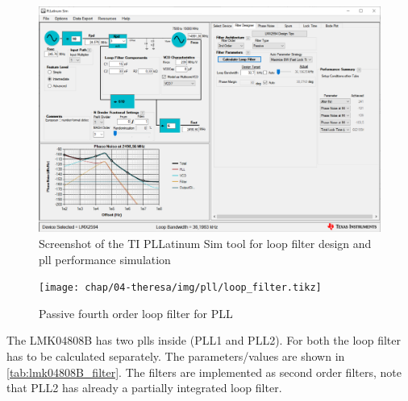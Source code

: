 \begin{figure}[tbh]
	\centering
	\includegraphics[width = \textwidth]{chap/04-theresa/img/pll/pll.PNG}
	\caption[PLL block diagram]{Screenshot of the TI PLLatinum Sim tool for loop filter design and \gls{pll} performance simulation}
	\label{fig:ti_pll}
\end{figure}


\begin{figure}[tbh]
	\centering
	\tikzexternaldisable
	\texttt{[image: chap/04-theresa/img/pll/loop\_filter.tikz]}
	\caption[PLL loop filter components]{Passive fourth order loop filter for PLL}
	\tikzexternalenable
	\label{fig:loop_filter}
\end{figure}

The LMK04808B has two \glspl{pll} inside (PLL1 and PLL2).
For both the loop filter has to be calculated separately. 
The parameters/values are shown in \autoref{tab:lmk04808B_filter}.
The filters are implemented as second order filters, note that PLL2 has already a partially integrated loop filter.

